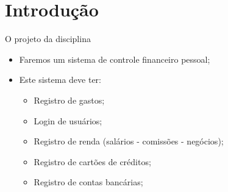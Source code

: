\documentclass{beamer}
\begin{document}
\section{Introdução}
\begin{frame}[label=proof]{O projeto da disciplina}
	\begin{itemize}
	\item Faremos um sistema de controle financeiro pessoal;
	\item Este sistema deve ter:
	\begin{itemize}
	\item Registro de gastos;
	\item Login de usuários;
	\item Registro de renda (salários - comissões - negócios);
	\item Registro de cartões de créditos;
	\item Registro de contas bancárias;
	\end{itemize}
	\end{itemize}
    \end{frame}
\end{document}
